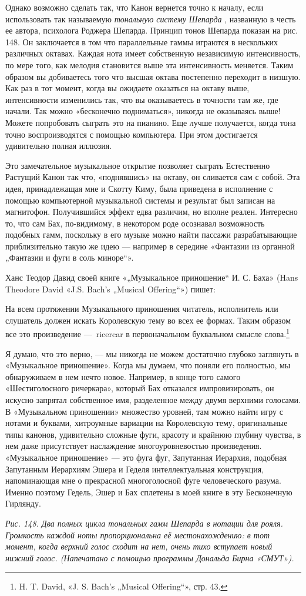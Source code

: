 Однако возможно сделать так, что Канон вернется точно к началу, если использовать так называемую \emph{тональную систему Шепарда} , названную в честь ее автора, психолога Роджера Шепарда. Принцип тонов Шепарда показан на рис. 148. Он заключается в том что параллельные гаммы играются в нескольких различных октавах. Каждая нота имеет собственную независимую интенсивность, по мере того, как мелодия становится выше эта интенсивность меняется. Таким образом вы добиваетесь того что высшая октава постепенно переходит в низшую. Как раз в тот момент, когда вы ожидаете оказаться на октаву выше, интенсивности изменились так, что вы оказываетесь в точности там же, где начали. Так можно «бесконечно подниматься», никогда не оказываясь выше! Можете попробовать сыграть это на пианино. Еще лучше получается, когда тона точно воспроизводятся с помощью компьютера. При этом достигается удивительно полная иллюзия.

Это замечательное музыкальное открытие позволяет сыграть Естественно Растущий Канон так что, «поднявшись» на октаву, он сливается сам с собой. Эта идея, принадлежащая мне и Скотту Киму, была приведена в исполнение с помощью компьютерной музыкальной системы и результат был записан на магнитофон. Получившийся эффект едва различим, но вполне реален. Интересно то, что сам Бах, по-видимому, в некотором роде осознавал возможность подобных гамм, поскольку в его музыке можно найти пассажи разрабатывающие приблизительно такую же идею --- например в середине «Фантазии из органной „Фантазии и фуги в соль миноре``».

Ханс Теодор Давид своей книге «„Музыкальное приношение`` И. С. Баха» (Hans Theodore David «J.S. Bach's „Musical Offering``») пишет:

На всем протяжении Музыкального приношения читатель, исполнитель или слушатель должен искать Королевскую тему во всех ее формах. Таким образом все это произведение ---~ricercar в первоначальном буквальном смысле слова.\footnote{H. T. David, «J. S. Bach's „Musical Offering``», стр. 43.}

Я думаю, что это верно, --- мы никогда не можем достаточно глубоко заглянуть в «Музыкальное приношение». Когда мы думаем, что поняли его полностью, мы обнаруживаем в нем нечто новое. Например, в конце того самого «Шестиголосного ричеркара», который Бах отказался импровизировать, он искусно запрятал собственное имя, разделенное между двумя верхними голосами. В «Музыкальном приношении» множество уровней, там можно найти игру с нотами и буквами, хитроумные вариации на Королевскую тему, оригинальные типы канонов, удивительно сложные фуги, красоту и крайнюю глубину чувства, в нем даже присутствует наслаждение многоуровневостью произведения. «Музыкальное приношение» --- это фуга фуг, Запутанная Иерархия, подобная Запутанным Иерархиям Эшера и Геделя интеллектуальная конструкция, напоминающая мне о прекрасной многоголосной фуге человеческого разума. Именно поэтому Гедель, Эшер и Бах сплетены в моей книге в эту Бесконечную Гирлянду.

\emph{Рис. 148. Два полных цикла тональных гамм Шепарда в нотации для рояля. Громкость каждой ноты пропорциональна её местонахождению: в тот момент, когда верхний голос сходит на нет, очень тихо вступает новый нижний голос. (Напечатано с помощью программы Дональда Бирна «СМУТ»).}

